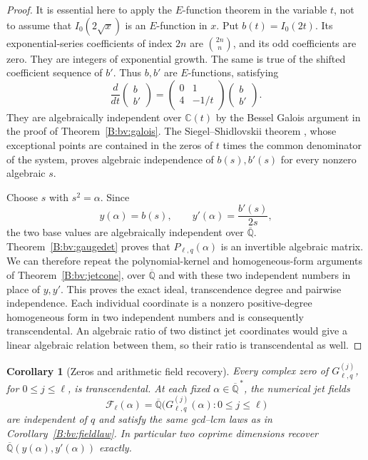 \documentclass[11pt,a4paper]{article}
\newtheorem{corollary}[theorem]{Corollary}
\theoremstyle{definition}
\theoremstyle{remark}
\numberwithin{equation}{section}
\begin{document}
\begin{proof}
It is essential here to apply the $E$-function theorem in the
variable $t$, not to assume that $I_0(2\sqrt{x})$ is an
$E$-function in $x$. Put $b(t)=I_0(2t)$.
Its exponential-series coefficients of index $2n$ are
$\binom{2n}{n}$, and its odd coefficients are zero. They are
integers of exponential growth. The same is true of the
shifted coefficient sequence of $b'$. Thus $b,b'$ are
$E$-functions, satisfying
\[
 \frac d{dt}\begin{pmatrix}b\\b'\end{pmatrix}
 =\begin{pmatrix}0&1\\4&-1/t\end{pmatrix}
 \begin{pmatrix}b\\b'\end{pmatrix}.
\]
They are algebraically independent over $\mathbb C(t)$ by the
Bessel Galois argument in the proof of Theorem~\ref{B:bv:galois}.
The Siegel--Shidlovskii theorem
\cite[Theorem~1.1]{BVBeukers2006}, whose exceptional points are
contained in the zeros of $t$ times the common denominator of
the system, proves algebraic independence of $b(s),b'(s)$
for every nonzero algebraic $s$.

Choose $s$ with $s^2=\alpha$. Since
\[
 y(\alpha)=b(s),\qquad y'(\alpha)=\frac{b'(s)}{2s},
\]
the two base values are algebraically independent over
$\overline{\mathbb Q}$. Theorem~\ref{B:bv:gaugedet} proves that
$P_{\ell,q}(\alpha)$ is an invertible algebraic matrix.
We can therefore repeat the polynomial-kernel and homogeneous-form
arguments of Theorem~\ref{B:bv:jetcone}, over
$\overline{\mathbb Q}$ and with these two independent numbers
in place of $y,y'$. This proves the exact ideal, transcendence
degree and pairwise independence. Each individual coordinate is
a nonzero positive-degree homogeneous form in two independent
numbers and is consequently transcendental. An algebraic ratio
of two distinct jet coordinates would give a linear algebraic
relation between them, so their ratio is transcendental as well.
\end{proof}

\begin{corollary}[Zeros and arithmetic field recovery]
\label{B:bv:zeros}
Every complex zero of $G_{\ell,q}^{(j)}$, for $0\le j\le\ell$,
is transcendental. At each fixed
$\alpha\in\overline{\mathbb Q}^{\,*}$, the numerical jet fields
\[
 \mathcal F_\ell(\alpha)
 =\overline{\mathbb Q}\bigl(G_{\ell,q}^{(j)}(\alpha):0\le j\le\ell\bigr)
\]
are independent of $q$ and satisfy the same gcd--lcm laws as in
Corollary~\ref{B:bv:fieldlaw}. In particular two coprime dimensions
recover
$\overline{\mathbb Q}(y(\alpha),y'(\alpha))$ exactly.
\end{corollary}
\end{document}
